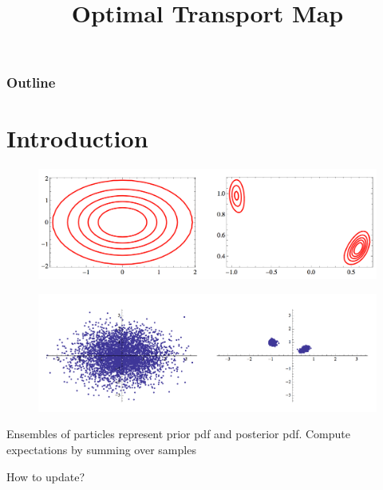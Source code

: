 \documentclass[table]{beamer}
\title[optimal transport]{
  Optimal Transport Map}
\author[Junjie Wang]{}
\institute[Harbin Institute of technology]{
  Institute for Computer and  Sciences -- Aerospace Software  Engineering }
\date{}
\begin{document}
\begin{CJK}{UTF8}{gbsn}

\begin{frame}[plain]
  \titlepage
\end{frame}

\begin{frame}
  \frametitle{Outline}

  \tableofcontents
\end{frame}

\section{Introduction}
\begin{frame}
\begin{figure}
\includegraphics[scale=0.2]{img/pirorposterior1.png}
\end{figure}
\end{frame}
\begin{frame}
\begin{figure}
\includegraphics[scale=0.2]{img/pirorposterior2.png}
\end{figure}
Ensembles of particles represent prior pdf and posterior pdf. Compute expectations by summing over samples
\end{frame}
\begin{frame}
How to update?
\begin{figure}

\end{figure}
\end{frame}
\end{CJK}
\end{document}
